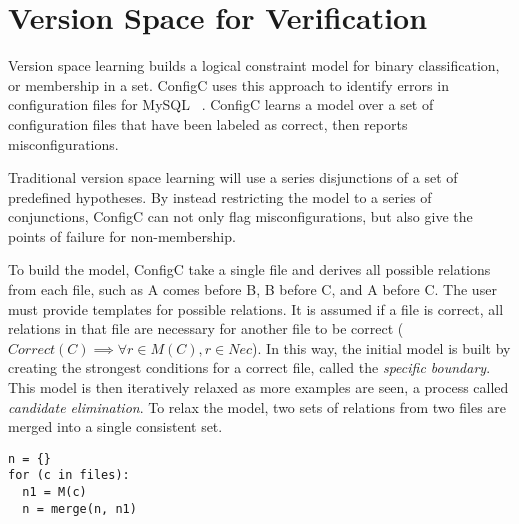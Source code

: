 \section{Version Space for Verification}

Version space learning builds a logical constraint model for binary classification, or membership in a set.
ConfigC uses this approach to identify errors in configuration files for MySQL~\cite{Santolucito2016} .
ConfigC learns a model over a set of configuration files that have been labeled as correct, then reports misconfigurations.

Traditional version space learning will use a series disjunctions of a set of predefined hypotheses.
By instead restricting the model to a series of conjunctions, ConfigC can not only flag misconfigurations, but also give the points of failure for non-membership.

To build the model, ConfigC take a single file and derives all possible relations from each file, such as A comes before B, B before C, and A before C.
The user must provide templates for possible relations.
It is assumed if a file is correct, all relations in that file are necessary for another file to be correct ($Correct(C) \implies \forall r \in M(C), r \in Nec$).
In this way, the initial model is built by creating the strongest conditions for a correct file, called the \textit{specific boundary}.
This model is then iteratively relaxed as more examples are seen, a process called \textit{candidate elimination}.
To relax the model, two sets of relations from two files are merged into a single consistent set.

\begin{lstlisting}
n = {}
for (c in files):
  n1 = M(c)
  n = merge(n, n1)
\end{lstlisting}
